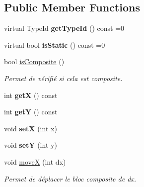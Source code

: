 \subsection*{Public Member Functions}
\begin{DoxyCompactItemize}
\item 
\mbox{\label{classstate_1_1_element_a21519707215e66543dbd8f3c7a90a101}} 
virtual Type\+Id {\bfseries get\+Type\+Id} () const =0
\item 
\mbox{\label{classstate_1_1_element_a8f24736ef9d139c43de6170bbf12b934}} 
virtual bool {\bfseries is\+Static} () const =0
\item 
\mbox{\label{classstate_1_1_element_ae7bba399afdeb9e002c28a3d0d389fd0}} 
bool \hyperlink{classstate_1_1_element_ae7bba399afdeb9e002c28a3d0d389fd0}{is\+Composite} ()
\begin{DoxyCompactList}\small\item\em Permet de vérifié si cela est composite. \end{DoxyCompactList}\item 
\mbox{\label{classstate_1_1_element_ad255661bd2e71f48014e6a80dd914ab0}} 
int {\bfseries getX} () const
\item 
\mbox{\label{classstate_1_1_element_a064240b24695cc5c052fbfd4a55489f2}} 
int {\bfseries getY} () const
\item 
\mbox{\label{classstate_1_1_element_a96672cf4848c5566115c2ea3fec8161d}} 
void {\bfseries setX} (int x)
\item 
\mbox{\label{classstate_1_1_element_aa66f35989d8c833ef566c01e23e63e10}} 
void {\bfseries setY} (int y)
\item 
\mbox{\label{classstate_1_1_element_a0e2e8e4cc3e33c4ed57c49a876d09476}} 
void \hyperlink{classstate_1_1_element_a0e2e8e4cc3e33c4ed57c49a876d09476}{moveX} (int dx)
\begin{DoxyCompactList}\small\item\em Permet de déplacer le bloc composite de dx. \end{DoxyCompactList}\item 

\end{DoxyCompactItemize}
